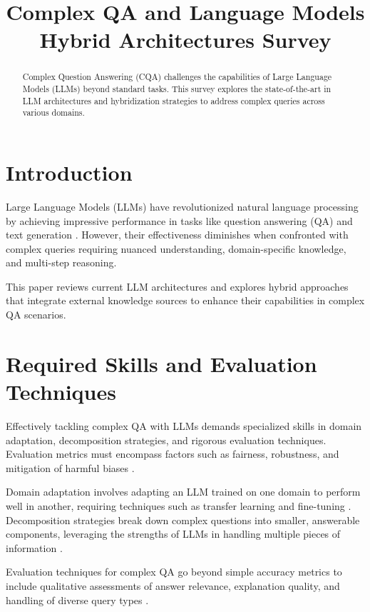 \documentclass[10pt,a4paper]{article}
\title{Complex QA and Language Models Hybrid Architectures Survey}
\author{}
\date{}
\begin{document}
\maketitle

\begin{abstract}
Complex Question Answering (CQA) challenges the capabilities of Large Language Models (LLMs) beyond standard tasks. This survey explores the state-of-the-art in LLM architectures and hybridization strategies to address complex queries across various domains.
\end{abstract}

\tableofcontents

\section{Introduction}
Large Language Models (LLMs) have revolutionized natural language processing by achieving impressive performance in tasks like question answering (QA) and text generation \cite{devlin2019bert, brown2020language}. However, their effectiveness diminishes when confronted with complex queries requiring nuanced understanding, domain-specific knowledge, and multi-step reasoning.

This paper reviews current LLM architectures and explores hybrid approaches that integrate external knowledge sources to enhance their capabilities in complex QA scenarios.

\section{Required Skills and Evaluation Techniques}
Effectively tackling complex QA with LLMs demands specialized skills in domain adaptation, decomposition strategies, and rigorous evaluation techniques. Evaluation metrics must encompass factors such as fairness, robustness, and mitigation of harmful biases \cite{bender2021dangers, chen2020evaluating}.

Domain adaptation involves adapting an LLM trained on one domain to perform well in another, requiring techniques such as transfer learning and fine-tuning \cite{ma2019domain}. Decomposition strategies break down complex questions into smaller, answerable components, leveraging the strengths of LLMs in handling multiple pieces of information \cite{khashabi2018question}.

Evaluation techniques for complex QA go beyond simple accuracy metrics to include qualitative assessments of answer relevance, explanation quality, and handling of diverse query types \cite{chen2020evaluating}.
\end{document}
